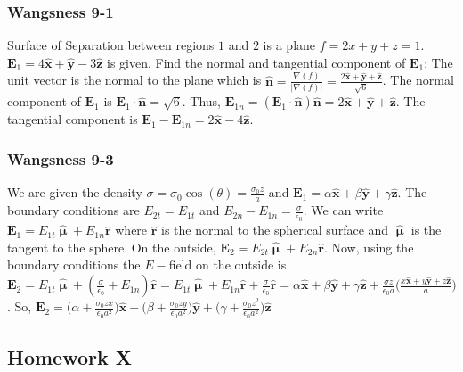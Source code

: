 \documentclass[crop=false,class=book,oneside]{standalone}
\begin{document}
            \subsubsection{Wangsness 9-1}
            Surface of Separation between regions $1$ and $2$ is a plane $f=2x+y+z=1$. $\mathbf{E}_1 = 4\hat{\mathbf{x}}+\hat{\mathbf{y}}-3\hat{\mathbf{z}}$ is given. Find the normal and tangential component of $\mathbf{E}_1$: The unit vector is the normal to the plane which is $\hat{\mathbf{n}}=\frac{\nabla(f)}{|\nabla(f)|} = \frac{2\hat{\mathbf{x}}+\hat{\mathbf{y}}+\hat{\mathbf{z}}}{\sqrt{6}}$. The normal component of $\mathbf{E}_1$ is $\mathbf{E}_1 \cdot \hat{\mathbf{n}} = \sqrt{6}$. Thus, $\mathbf{E}_{1n} = (\mathbf{E}_1 \cdot \hat{\mathbf{n}})\hat{\mathbf{n}} = 2\hat{\mathbf{x}}+\hat{\mathbf{y}}+\hat{\mathbf{z}}$. The tangential component is $\mathbf{E}_1 - \mathbf{E}_{1n} = 2\hat{\mathbf{x}}-4\hat{\mathbf{z}}$.
            \subsubsection{Wangsness 9-3}
            We are given the density $\sigma = \sigma_0 \cos(\theta) = \frac{\sigma_0 z}{a}$ and $\mathbf{E}_1 = \alpha \hat{\mathbf{x}}+\beta \hat{\mathbf{y}}+ \gamma \hat{\mathbf{z}}$. The boundary conditions are $E_{2t} = E_{1t}$ and $E_{2n}-E_{1n} = \frac{\sigma}{\epsilon_0}$. We can write $\mathbf{E}_1 = E_{1t}\hat{\boldsymbol{\upmu}}+E_{1n} \hat{\mathbf{r}}$ where $\hat{\mathbf{r}}$ is the normal to the spherical surface and $\hat{\boldsymbol{\upmu}}$ is the tangent to the sphere. On the outside, $\mathbf{E}_2 = E_{2t}\hat{\boldsymbol{\upmu}}+E_{2n}\hat{\mathbf{r}}$. Now, using the boundary conditions the $E-$field on the outside is $\mathbf{E}_2 = E_{1t}\hat{\boldsymbol{\upmu}}+(\frac{\sigma}{\epsilon_0}+E_{1n})\hat{\mathbf{r}} = E_{1t}\hat{\boldsymbol{\upmu}}+E_{1n}\hat{\mathbf{r}}+\frac{\sigma}{\epsilon_0}\hat{\mathbf{r}} = \alpha \hat{\mathbf{x}}+\beta \hat{\mathbf{y}}+\gamma \hat{\mathbf{z}} + \frac{\sigma z}{\epsilon_0 a}\bigg(\frac{x\hat{\mathbf{x}}+y\hat{\mathbf{y}}+z\hat{\mathbf{z}}}{a}\bigg)$. So, $\mathbf{E}_2 = \big(\alpha+\frac{\sigma_0 zx}{\epsilon_0 a^2}\big)\hat{\mathbf{x}}+\big(\beta + \frac{\sigma_0 zy}{\epsilon_0 a^2}\big)\hat{\mathbf{y}}+\big(\gamma+ \frac{\sigma_0 z^2}{\epsilon_0 a^2}\big)\hat{\mathbf{z}}$
        \subsection{Homework X}
\end{document}

